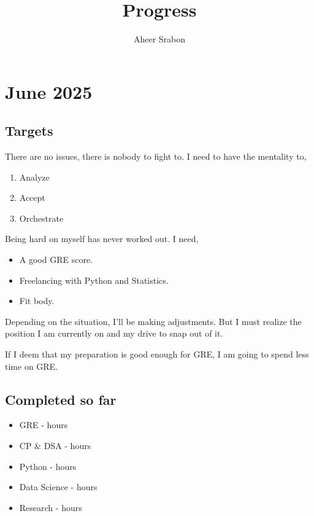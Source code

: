 \documentclass[11pt]{article}
\title{Progress}
\author{Aheer Srabon}
\date{}
\begin{document}
\maketitle

\section*{June 2025}



\subsection*{Targets}
\noindent There are no issues, there is nobody to fight to. I need to have the mentality to,

\begin{enumerate}
  \item Analyze
  \item Accept
  \item Orchestrate
\end{enumerate}

\noindent Being hard on myself has never worked out. I need,

\begin{itemize}
  \item A good GRE score.
  \item Freelancing with Python and Statistics.
  \item Fit body.
\end{itemize}

\noindent Depending on the situation, I'll be making adjustments. But I must realize the position I am currently
on and my drive to snap out of it.

\noindent If I deem that my preparation is good enough for GRE, I am going to spend less time on GRE.

\subsection*{Completed so far}
\begin{itemize}
\itemsep0em
  \item GRE           - \juneGRE hours
  \item CP \& DSA     - \juneDSACP hours
  \item Python        - \junePYTHON hours
  \item Data Science  - \juneDS hours
  \item Research      - \juneRESEARCH hours
\end{itemize}
\end{document}
